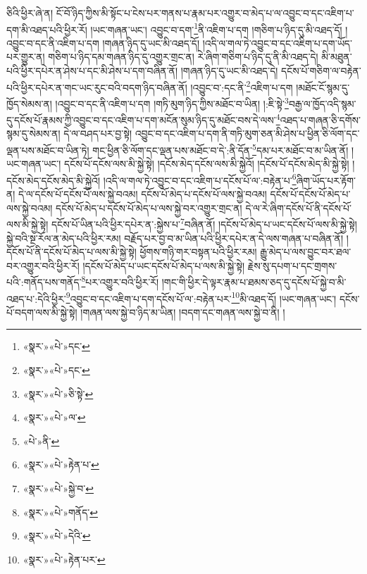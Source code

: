 ཅིའི་ཕྱིར་ཞེ་ན། ངོ་བོ་ཉིད་ཀྱིས་མི་སྟོང་པ་ངེས་པར་གནས་པ་རྣམ་པར་འགྱུར་བ་མེད་པ་ལ་འབྱུང་བ་དང་འཇིག་པ་དག་མི་འཐད་པའི་ཕྱིར་རོ། །ཡང་གཞན་ཡང་། འབྱུང་བ་དག་\footnote{«སྣར་»«པེ་»དང་}ནི་འཇིག་པ་དག །གཅིག་པ་ཉིད་དུ་མི་འཐད་དོ། །འབྱུང་བ་དང་ནི་འཇིག་པ་དག །གཞན་ཉིད་དུ་ཡང་མི་འཐད་དོ། །འདི་ལ་གལ་ཏེ་འབྱུང་བ་དང་འཇིག་པ་དག་ཡོད་པར་གྱུར་ན། གཅིག་པ་ཉིད་དམ་གཞན་ཉིད་དུ་འགྱུར་གྲང་ན། རེ་ཞིག་གཅིག་པ་ཉིད་དུ་ནི་མི་འཐད་དེ། མི་མཐུན་པའི་ཕྱིར་དཔེར་ན་ཤེས་པ་དང་མི་ཤེས་པ་དག་བཞིན་ནོ། །གཞན་ཉིད་དུ་ཡང་མི་འཐད་དེ། དངོས་པོ་གཅིག་ལ་བརྟེན་པའི་ཕྱིར་དཔེར་ན་གང་ཡང་རུང་བའི་བདག་ཉིད་བཞིན་ནོ། །འབྱུང་བ་:དང་ནི་\footnote{«སྣར་»«པེ་»དང་}འཇིག་པ་དག །མཐོང་ངོ་སྙམ་དུ་ཁྱོད་སེམས་ན། །འབྱུང་བ་དང་ནི་འཇིག་པ་དག །གཏི་མུག་ཉིད་ཀྱིས་མཐོང་བ་ཡིན། །:ཇི་སྟེ་\footnote{«སྣར་»«པེ་»ཅི་སྟེ་}བརྒྱ་ལ་ཁྱོད་འདི་སྙམ་དུ་དངོས་པོ་རྣམས་ཀྱི་འབྱུང་བ་དང་འཇིག་པ་དག་མངོན་སུམ་ཉིད་དུ་མཐོང་བས་དེ་ལས་\footnote{«སྣར་»«པེ་»ལ་}འཐད་པ་གཞན་ཅི་དགོས་སྙམ་དུ་སེམས་ན། དེ་ལ་བཤད་པར་བྱ་སྟེ། འབྱུང་བ་དང་འཇིག་པ་དག་ནི་གཏི་མུག་ཅན་མི་ཤེས་པ་ཕྱིན་ཅི་ལོག་དང་ལྡན་པས་མཐོང་བ་ཡིན་ཏེ། གང་ཕྱིན་ཅི་ལོག་དང་ལྡན་པས་མཐོང་བ་དེ་:ནི་དོན་\footnote{«པེ་»ནི་}དམ་པར་མཐོང་བ་མ་ཡིན་ནོ། །ཡང་གཞན་ཡང་། དངོས་པོ་དངོས་ལས་མི་སྐྱེ་སྟེ། །དངོས་མེད་དངོས་ལས་མི་སྐྱེའོ། །དངོས་པོ་དངོས་མེད་མི་སྐྱེ་སྟེ། །དངོས་མེད་དངོས་མེད་མི་སྐྱེའོ། །འདི་ལ་གལ་ཏེ་འབྱུང་བ་དང་འཇིག་པ་དངོས་པོ་ལ་:བརྟེན་པ་\footnote{«སྣར་»«པེ་»རྟེན་པ་}ཞིག་ཡོད་པར་རྟོག་ན། དེ་ལ་དངོས་པོ་དངོས་པོ་ལས་སྐྱེ་བའམ། དངོས་པོ་མེད་པ་དངོས་པོ་ལས་སྐྱེ་བའམ། དངོས་པོ་དངོས་པོ་མེད་པ་ལས་སྐྱེ་བའམ། དངོས་པོ་མེད་པ་དངོས་པོ་མེད་པ་ལས་སྐྱེ་བར་འགྱུར་གྲང་ན། དེ་ལ་རེ་ཞིག་དངོས་པོ་ནི་དངོས་པོ་ལས་མི་སྐྱེ་སྟེ། དངོས་པོ་ཡིན་པའི་ཕྱིར་དཔེར་ན་:སྐྱེས་པ་\footnote{«སྣར་»«པེ་»སྐྱེ་བ་}བཞིན་ནོ། །དངོས་པོ་མེད་པ་ཡང་དངོས་པོ་ལས་མི་སྐྱེ་སྟེ། སྐྱེ་བའི་སྔ་རོལ་ན་མེད་པའི་ཕྱིར་རམ། བརྗོད་པར་བྱ་བ་མ་ཡིན་པའི་ཕྱིར་དཔེར་ན་དེ་ལས་གཞན་པ་བཞིན་ནོ། །དངོས་པོ་ནི་དངོས་པོ་མེད་པ་ལས་མི་སྐྱེ་སྟེ། ཕྱོགས་གཉི་གར་བསྟན་པའི་ཕྱིར་རམ། རྒྱུ་མེད་པ་ལས་བྱུང་བར་ཐལ་བར་འགྱུར་བའི་ཕྱིར་རོ། །དངོས་པོ་མེད་པ་ཡང་དངོས་པོ་མེད་པ་ལས་མི་སྐྱེ་སྟེ། རྗེས་སུ་དཔག་པ་དང་གྲགས་པའི་:གནོད་པས་གནོད་\footnote{«སྣར་»«པེ་»གནོད་}པར་འགྱུར་བའི་ཕྱིར་རོ། །གང་གི་ཕྱིར་དེ་ལྟར་རྣམ་པ་ཐམས་ཅད་དུ་དངོས་པོ་སྐྱེ་བ་མི་འཐད་པ་:དེའི་ཕྱིར་\footnote{«སྣར་»«པེ་»དེའི་}འབྱུང་བ་དང་འཇིག་པ་དག་དངོས་པོ་ལ་:བརྟེན་པར་\footnote{«སྣར་»«པེ་»རྟེན་པར་}མི་འཐད་དོ། །ཡང་གཞན་ཡང་། དངོས་པོ་བདག་ལས་མི་སྐྱེ་སྟེ། །གཞན་ལས་སྐྱེ་བ་ཉིད་མ་ཡིན། །བདག་དང་གཞན་ལས་སྐྱེ་བ་ནི། །
